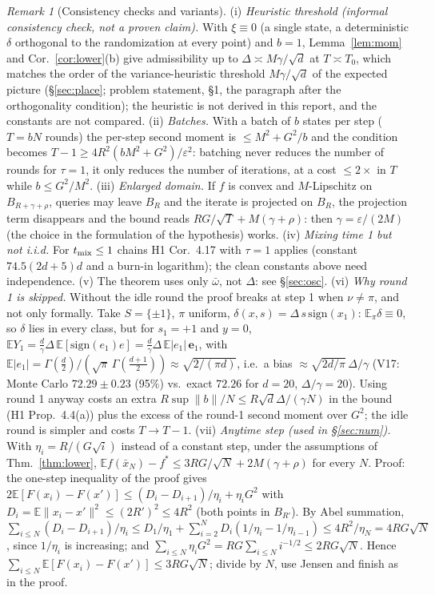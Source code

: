 \documentclass[11pt,a4paper]{article}
\numberwithin{equation}{section}
\theoremstyle{definition}
\theoremstyle{remark}
\newtheorem{remark}[theorem]{Remark}
\newcommand{\E}{\mathbb E}\newcommand{\R}{\mathbb R}\newcommand{\Z}{\mathbb Z}\newcommand{\Prob}{\mathbb P}
\newcommand{\norm}[1]{\lVert #1\rVert}\newcommand{\abs}[1]{\lvert #1\rvert}\newcommand{\ip}[2]{\langle #1,#2\rangle}
\newcommand{\wbar}{\bar\omega}\newcommand{\Atwo}{\cA^{\rm 2pt}_\gamma}
\begin{document}
\begin{remark}[Consistency checks and variants]\label{rem:lower}
(i) \emph{Heuristic threshold (informal consistency check, not a proven claim).} With $\xi\equiv0$ (a single state, a deterministic $\delta$ orthogonal to the randomization at every point) and $b=1$, Lemma~\ref{lem:mom} and Cor.~\ref{cor:lower}(b) give admissibility up to $\Delta\asymp M\gamma/\sqrt d$ at $T\asymp T_0$, which matches the order of the variance-heuristic threshold $M\gamma/\sqrt d$ of the expected picture (\S\ref{sec:place}; problem statement, \S1, the paragraph after the orthogonality condition); the heuristic is not derived in this report, and the constants are not compared. (ii) \emph{Batches.} With a batch of $b$ states per step ($T=bN$ rounds) the per-step second moment is $\le M^2+G^2/b$ and the condition becomes $T-1\ge4R^2(bM^2+G^2)/\varepsilon^2$: batching never reduces the number of rounds for $\tau=1$, it only reduces the number of iterations, at a cost $\le2\times$ in $T$ while $b\le G^2/M^2$. (iii) \emph{Enlarged domain.} If $f$ is convex and $M$-Lipschitz on $B_{R+\gamma+\rho}$, queries may leave $B_R$ and the iterate is projected on $B_R$, the projection term disappears and the bound reads $RG/\sqrt T+M(\gamma+\rho)$: then $\gamma=\varepsilon/(2M)$ (the choice in the formulation of the hypothesis) works. (iv) \emph{Mixing time 1 but not i.i.d.} For $t_{\rm mix}\le1$ chains H1 Cor.~4.17 with $\tau=1$ applies (constant $74.5(2d+5)d$ and a burn-in logarithm); the clean constants above need independence. (v) The theorem uses only $\wbar$, not $\Delta$: see \S\ref{sec:osc}.
(vi) \emph{Why round 1 is skipped.} Without the idle round the proof breaks at step 1 when $\nu\ne\pi$, and not only formally. Take $S=\{\pm1\}$, $\pi$ uniform, $\delta(x,s)=\Delta\,s\,\mathrm{sign}(x_1)$: $\E_\pi\delta\equiv0$, so $\delta$ lies in every class, but for $s_1=+1$ and $y=0$, $\E Y_1=\frac d\gamma\Delta\,\E[\mathrm{sign}(e_1)e]=\frac d\gamma\Delta\,\E\abs{e_1}\,\mathbf e_1$, with $\E\abs{e_1}=\Gamma(\frac d2)/(\sqrt\pi\,\Gamma(\frac{d+1}2))\approx\sqrt{2/(\pi d)}$, i.e.\ a bias $\approx\sqrt{2d/\pi}\,\Delta/\gamma$ (V17: Monte Carlo $72.29\pm0.23$ (95\%) vs.\ exact $72.26$ for $d=20$, $\Delta/\gamma=20$). Using round 1 anyway costs an extra $R\sup\norm b/N\le R\sqrt d\Delta/(\gamma N)$ in the bound (H1 Prop.~4.4(a)) plus the excess of the round-1 second moment over $G^2$; the idle round is simpler and costs $T\to T-1$.
(vii) \emph{Anytime step (used in \S\ref{sec:num}).} With $\eta_i=R/(G\sqrt i)$ instead of a constant step, under the assumptions of Thm.~\ref{thm:lower},
$\E f(\bar x_N)-f^*\le3RG/\sqrt N+2M(\gamma+\rho)$ for every $N$. Proof: the one-step inequality of the proof gives $2\E[F(x_i)-F(x')]\le(D_i-D_{i+1})/\eta_i+\eta_iG^2$ with $D_i=\E\norm{x_i-x'}^2\le(2R')^2\le4R^2$ (both points in $B_{R'}$). By Abel summation, $\sum_{i\le N}(D_i-D_{i+1})/\eta_i\le D_1/\eta_1+\sum_{i=2}^ND_i(1/\eta_i-1/\eta_{i-1})\le4R^2/\eta_N=4RG\sqrt N$, since $1/\eta_i$ is increasing; and $\sum_{i\le N}\eta_iG^2=RG\sum_{i\le N}i^{-1/2}\le2RG\sqrt N$. Hence $\sum_{i\le N}\E[F(x_i)-F(x')]\le3RG\sqrt N$; divide by $N$, use Jensen and finish as in the proof.
\end{remark}
\end{document}
